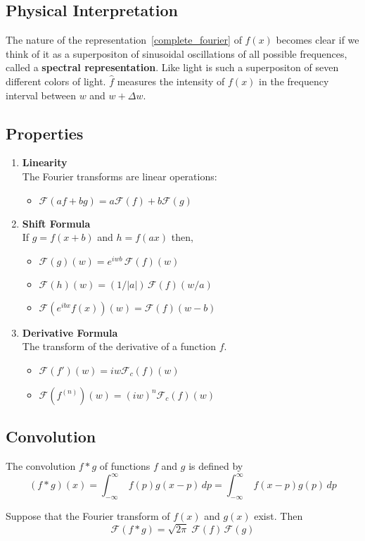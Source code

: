 \documentclass[aima331_lecturenotes_ku.tex]{subfiles}
\begin{document}
 \subsection{Physical Interpretation}
 The nature of the representation~\ref{complete_fourier} of $f(x)$ becomes clear if we think of it as a superpositon of sinusoidal oscillations of all possible frequences, called a \textbf{spectral representation}. Like light is such a superpositon of seven different colors of light. $\hat{f}$ measures the intensity of $f(x)$ in the frequency interval between $w$ and $w+\Delta w$.

 \subsection{Properties}
 \begin{enumerate}
 \item \textbf{Linearity} \\[1mm]
   The Fourier transforms are linear operations:
  \begin{itemize}
  \item $\mathcal{F} (af+bg)=a\mathcal{F}(f) + b \mathcal{F}(g)$
   \end{itemize}

 \item \textbf{Shift Formula} \\[1mm]
   If $g=f(x+b)$ and $h=f(ax)$ then,
   \begin{itemize}
   \item $\mathcal{F}(g)(w)= e^{iwb} \, \mathcal{F}(f)(w)$
   \item $\mathcal{F}(h)(w)= (1/|a|) \, \mathcal{F}(f)(w/a)$
    \item $\mathcal{F}(e^{ibx}f(x))(w)=  \mathcal{F}(f)(w-b)$
   \end{itemize}

 \item \textbf{Derivative Formula} \\[1mm]
   The transform of the derivative of a function $f$.
   \begin{itemize}
   \item $\displaystyle \mathcal{F}(f')(w)=iw\mathcal{F}_c(f)(w)$
    \item $\displaystyle \mathcal{F}(f^{(n)})(w)=(iw)^n\mathcal{F}_c(f)(w)$
   \end{itemize}
 \end{enumerate}

 \subsection{Convolution}
 The convolution $f * g$ of functions $f$ and $g$ is defined by
 \begin{equation}
   \label{conv}
   (f*g)(x) = \int_{-\infty}^{\infty} \; f(p)g(x-p)\,dp = \int_{-\infty}^{\infty} \; f(x-p)g(p)\,dp
 \end{equation}
 \begin{theorem}
   Suppose that the Fourier transform of $f(x)$ and $g(x)$ exist. Then
   \begin{equation}
     \label{conv_theorem}
     \mathcal{F}(f*g)=\sqrt{2 \pi}\; \mathcal{F}(f)\,\mathcal{F}(g)
   \end{equation}
 \end{theorem}
\end{document}
